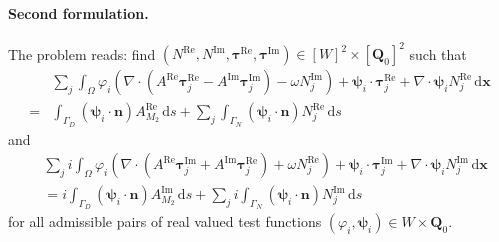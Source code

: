 \documentclass[11pt,a4paper]{article}
\begin{document}
\paragraph{Second formulation.} The problem reads: find $(N^\mathrm{Re},N^\mathrm{Im},\boldsymbol{\tau}^\mathrm{Re},\boldsymbol{\tau}^\mathrm{Im})\in [W]^2\times [\mathbf{Q}_0]^2$ such that
\begin{align}
&\sum_j\int_\Omega \varphi_i\left(\nabla\cdot(A^\mathrm{Re}\boldsymbol{\tau}_j^\mathrm{Re}-A^\mathrm{Im}\boldsymbol{\tau}_j^\mathrm{Im})-\omega N^\mathrm{Im}_j\right)+
\boldsymbol{\psi}_i\cdot\boldsymbol{\tau}^\mathrm{Re}_j+
\nabla\cdot\boldsymbol{\psi}_iN^\mathrm{Re}_j
\,\mathrm{d}\mathbf{x}\\
=&
\int_{\Gamma_D}(\boldsymbol{\psi}_i\cdot\mathbf{n})A^\mathrm{Re}_{M_2}\,\mathrm{d}s
+
\sum_j\int_{\Gamma_N}(\boldsymbol{\psi}_i\cdot\mathbf{n})N^\mathrm{Re}_j\,\mathrm{d}s
\end{align}
and
\begin{align}
&\sum_ji\int_\Omega \varphi_i\left(\nabla\cdot(A^\mathrm{Re}\boldsymbol{\tau}_j^\mathrm{Im}+A^\mathrm{Im}\boldsymbol{\tau}_j^\mathrm{Re})+\omega N^\mathrm{Re}_j\right)+
\boldsymbol{\psi}_i\cdot\boldsymbol{\tau}^\mathrm{Im}_j+
\nabla\cdot\boldsymbol{\psi}_iN^\mathrm{Im}_j
\,\mathrm{d}\mathbf{x}\\
&=
i\int_{\Gamma_D}(\boldsymbol{\psi}_i\cdot\mathbf{n})A^\mathrm{Im}_{M_2}\,\mathrm{d}s
+
\sum_ji\int_{\Gamma_N}(\boldsymbol{\psi}_i\cdot\mathbf{n})N^\mathrm{Im}_j\,\mathrm{d}s
\end{align}
for all admissible pairs of real valued test functions $(\varphi_i,\boldsymbol{\psi}_i)\in W\times\mathbf{Q}_0$.
\end{document}
